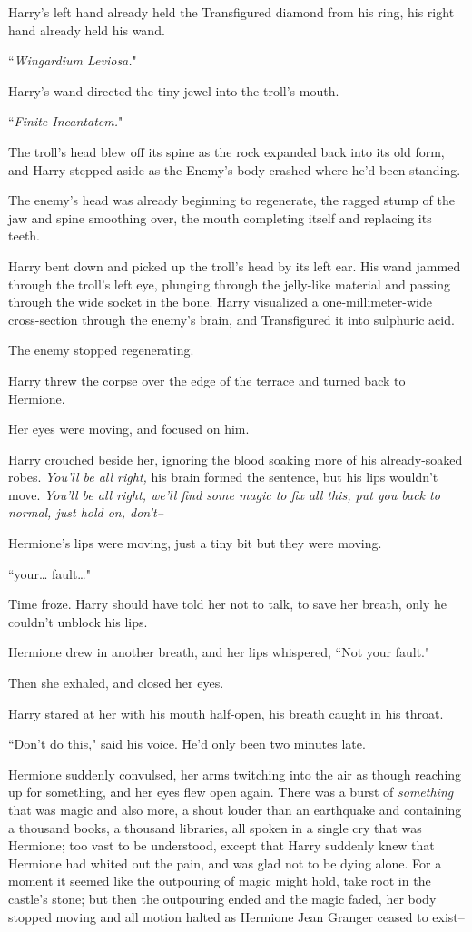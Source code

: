 Harry's left hand already held the Transfigured diamond from his ring, his right hand already held his wand.

``\emph{Wingardium Leviosa.}"

Harry's wand directed the tiny jewel into the troll's mouth.

``\emph{Finite Incantatem.}"

The troll's head blew off its spine as the rock expanded back into its old form, and Harry stepped aside as the Enemy's body crashed where he'd been standing.

The enemy's head was already beginning to regenerate, the ragged stump of the jaw and spine smoothing over, the mouth completing itself and replacing its teeth.

Harry bent down and picked up the troll's head by its left ear. His wand jammed through the troll's left eye, plunging through the jelly-like material and passing through the wide socket in the bone. Harry visualized a one-millimeter-wide cross-section through the enemy's brain, and Transfigured it into sulphuric acid.

The enemy stopped regenerating.

Harry threw the corpse over the edge of the terrace and turned back to Hermione.

Her eyes were moving, and focused on him.

Harry crouched beside her, ignoring the blood soaking more of his already-soaked robes. \emph{You'll be all right,} his brain formed the sentence, but his lips wouldn't move. \emph{You'll be all right, we'll find some magic to fix all this, put you back to normal, just hold on, don't\---}

Hermione's lips were moving, just a tiny bit but they were moving.

``your{\ldots} fault{\ldots}"

Time froze. Harry should have told her not to talk, to save her breath, only he couldn't unblock his lips.

Hermione drew in another breath, and her lips whispered, ``Not your fault."

Then she exhaled, and closed her eyes.

Harry stared at her with his mouth half-open, his breath caught in his throat.

``Don't do this," said his voice. He'd only been two minutes late.

Hermione suddenly convulsed, her arms twitching into the air as though reaching up for something, and her eyes flew open again. There was a burst of \emph{something} that was magic and also more, a shout louder than an earthquake and containing a thousand books, a thousand libraries, all spoken in a single cry that was Hermione; too vast to be understood, except that Harry suddenly knew that Hermione had whited out the pain, and was glad not to be dying alone. For a moment it seemed like the outpouring of magic might hold, take root in the castle's stone; but then the outpouring ended and the magic faded, her body stopped moving and all motion halted as Hermione Jean Granger ceased to exist\---

